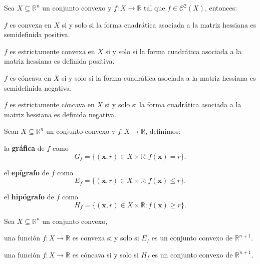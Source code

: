 \documentclass[8pt,a4paper]{extarticle}
\begin{document}
\begin{multicols}{3}
\sectionbreak

\begin{boxtheo}
	Sea $X \subseteq \mathbb{R}^n$ un conjunto convexo y $f : X \to \mathbb{R}$ tal que $f \in \mathcal{C}^2(X)$, entonces:
	\begin{eqlist}
	\item $f$ es convexa en $X$ si y solo si la forma cuadrática asociada a la matriz hessiana es semidefinida positiva.
	\item $f$ es estrictamente convexa en $X$ si y solo si la forma cuadrática asociada a la matriz hessiana es definida positiva.
	\item $f$ es cóncava en $X$ si y solo si la forma cuadrática asociada a la matriz hessiana es semidefinida negativa.
	\item $f$ es estrictamente cóncava en $X$ si y solo si la forma cuadrática asociada a la matriz hessiana es definida negativa.
	\end{eqlist}
\end{boxtheo}

\begin{boxdef}
	Sean $X \subseteq \mathbb{R}^n$ un conjunto convexo y $f : X \to \mathbb{R}$, definimos:
	\begin{bulletlist}
	\item la \textbf{gráfica} de $f$ como $$G_f = \{ (\mathbf{x}, r) \in X \times \mathbb{R} : f(\mathbf{x}) = r \} .$$
	\item el \textbf{epígrafo} de $f$ como $$E_f = \{ (\mathbf{x}, r) \in X \times \mathbb{R} : f(\mathbf{x}) \le r \} .$$
	\item el \textbf{hipógrafo} de $f$ como $$H_f = \{ (\mathbf{x}, r) \in X \times \mathbb{R} : f(\mathbf{x}) \ge r \} .$$
	\end{bulletlist}
\end{boxdef}

\begin{boxtheo}
	Sea $X \subseteq \mathbb{R}^n$ un conjunto convexo,
	\begin{eqlist}
	\item una función $f : X \to \mathbb{R}$ es convexa si y solo si $E_f$ es un conjunto convexo de $\mathbb{R}^{n+1}$.
	\item una función $f : X \to \mathbb{R}$ es cóncava si y solo si $H_f$ es un conjunto convexo de $\mathbb{R}^{n+1}$.
	\end{eqlist}
\end{boxtheo}


\end{multicols}
\end{document}
